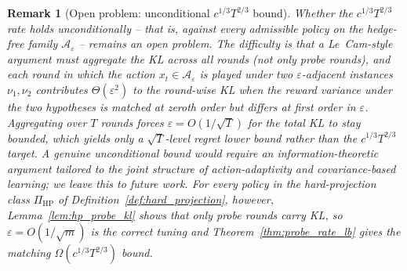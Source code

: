 \documentclass[11pt]{article}
\newcommand{\cA}{\mathcal{A}}
\newtheorem{remark}{Remark}
\begin{document}
\begin{remark}[Open problem: unconditional $c^{1/3}T^{2/3}$ bound]
\label{rem:gap_closure}
Whether the $c^{1/3}T^{2/3}$ rate holds unconditionally -- that is,
against every admissible policy on the hedge-free family
$\cA_\varepsilon$ -- remains an open problem.  The difficulty is that a
Le~Cam-style argument must aggregate the KL across \emph{all} rounds
(not only probe rounds), and each round in which the action
$x_t\in\cA_\varepsilon$ is played under two $\varepsilon$-adjacent
instances $\nu_1,\nu_2$ contributes $\Theta(\varepsilon^2)$ to the
round-wise KL when the reward variance under the two hypotheses is
matched at zeroth order but differs at first order in $\varepsilon$.
Aggregating over $T$ rounds forces $\varepsilon=O(1/\sqrt T)$ for the
total KL to stay bounded, which yields only a $\sqrt T$-level regret
lower bound rather than the $c^{1/3}T^{2/3}$ target.
A genuine unconditional bound would require an information-theoretic
argument tailored to the joint structure of action-adaptivity and
covariance-based learning; we leave this to future work.
For every policy in the hard-projection class $\Pi_{\mathrm{HP}}$ of
Definition~\ref{def:hard_projection}, however,
Lemma~\ref{lem:hp_probe_kl} shows that only probe rounds carry KL, so
$\varepsilon=O(1/\sqrt m)$ is the correct tuning and
Theorem~\ref{thm:probe_rate_lb} gives the matching
$\Omega(c^{1/3}T^{2/3})$ bound.
\end{remark}
\end{document}
